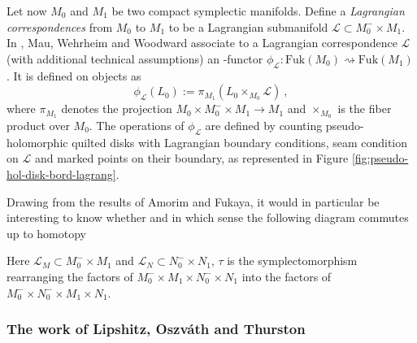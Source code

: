 \documentclass[twoside, 12pt]{amsart}
\theoremstyle{remark}
\begin{document}
Let now $M_0$ and $M_1$ be two compact symplectic manifolds. Define a \emph{Lagrangian correspondences} from $M_0$ to $M_1$ to be a Lagrangian submanifold $\mathcal{L} \subset M_0^{-} \times M_1$.
In \cite{mau-wehrheim-woodward}, Mau, Wehrheim and Woodward associate to a Lagrangian correspondence $\mathcal{L}$ (with additional technical assumptions) an \Ainf -functor $\phi_{\mathcal{L}} : \mathrm{Fuk}(M_0) \rightsquigarrow \mathrm{Fuk}(M_1)$.  
It is defined on objects as 
\[ \phi_{\mathcal{L}} (L_0) := \pi_{M_1} ( L_0 \times_{M_0} \mathcal{L} ) \ , \]
where $\pi_{M_1}$ denotes the projection $M_0 \times M_0^{-} \times M_1 \rightarrow M_1$ and $\times_{M_0}$ is the fiber product over $M_0$. The operations of $\phi_{\mathcal{L}}$ are defined by counting pseudo-holomorphic quilted disks with Lagrangian boundary conditions, seam condition on $\mathcal{L}$ and marked points on their boundary, as represented in Figure \ref{fig:pseudo-hol-disk-bord-lagrang}. 

Drawing from the results of Amorim and Fukaya, it would in particular be interesting to know whether and in which sense the following diagram commutes up to homotopy
\begin{center} 
\end{center}
Here $\mathcal{L}_M \subset M_0^{-} \times M_1$ and $\mathcal{L}_N \subset N_0^- \times N_1$, $\tau$ is the symplectomorphism rearranging the factors of $M_0^{-} \times M_1 \times N_0^- \times N_1$ into the factors of $M_0^{-} \times N_0^- \times M_1 \times N_1$.

\subsubsection{The work of Lipshitz, {Oszv\'ath} and Thurston}
\end{document}
